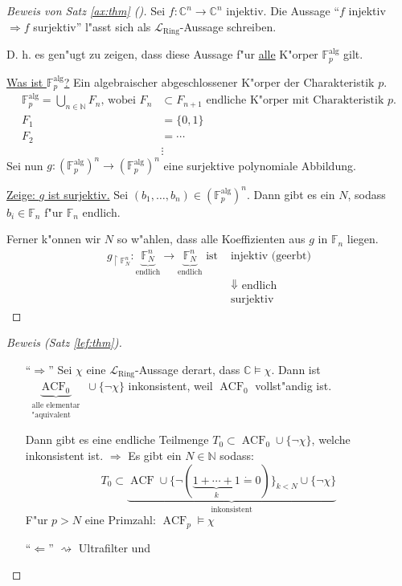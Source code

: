 \documentclass[a4paper,12pt,numbers=noenddot,parskip=full]{scrartcl}
\newcommand{\setN}{\mathbb{N}}
\newcommand{\setC}{\mathbb{C}}
\newcommand{\scrL}{\mathcal{L}}
\DeclareMathOperator{\acf}{ACF}
\theoremstyle{dotless}
\theoremstyle{remark}
\begin{document}
\begin{proof}[Beweis von Satz \ref{ax:thm} ()]
	Sei $f: \setC^n \longrightarrow \setC^n$ injektiv. Die Aussage "`$f$ injektiv $\Rightarrow f$ surjektiv"' l"asst sich als $\scrL_\text{Ring}$-Aussage schreiben.
	
	D. h. es gen"ugt zu zeigen, dass diese Aussage f"ur \underline{alle} K"orper $\mathbb{F}^\text{alg}_p$ gilt.
	
	\underline{Was ist $\mathbb{F}^\text{alg}_p$?} Ein algebraischer abgeschlossener K"orper der Charakteristik $p$.
	\begin{align*}
		\mathbb{F}^\text{alg}_p = \bigcup\limits_{n \in \setN} F_n \text{, wobei } F_n &\subset F_{n+1} \text{ endliche K"orper mit Charakteristik } p.\\
		F_1&=\{0,1\}\\
		F_2&= \cdots\\
		&\vdots
	\end{align*}
	Sei nun $g: (\mathbb{F}^\text{alg}_p)^n \longrightarrow (\mathbb{F}^\text{alg}_p)^n$ eine surjektive polynomiale Abbildung.
	
	\underline{Zeige: $g$ ist surjektiv.} Sei $(b_1, \dots, b_n) \in (\mathbb{F}^\text{alg}_p)^n$. Dann gibt es ein $N$, sodass $b_i \in \mathbb{F}_n$ f"ur $\mathbb{F}_n$ endlich.
	
	Ferner k"onnen wir $N$ so w"ahlen, dass alle Koeffizienten aus $g$ in $\mathbb{F}_n$ liegen.
	\begin{align*}
		g_{\upharpoonright \mathbb{F}^n_N}: \underbrace{\mathbb{F}^n_N}_{\text{endlich}} \longrightarrow \underbrace{\mathbb{F}^n_N}_{\text{endlich}} \text{ ist }&\text{injektiv (geerbt)}\\
		&\Downarrow \text{ endlich} \\
		&\text{surjektiv}
	\end{align*}
\end{proof}

\begin{proof}[Beweis  (Satz \ref{lef:thm})]
	\begin{itemize}
		\item["`$\Rightarrow$"'] Sei $\chi$ eine $\scrL_\text{Ring}$-Aussage derart, dass $\setC \models \chi$. Dann ist $\underbrace{\acf_0}_{\substack{\text{alle elementar}\\ \text{"aquivalent}}} \cup \{\lnot \chi \}$ inkonsistent, weil $\acf_0$ vollst"andig ist.
		
		Dann gibt es eine endliche Teilmenge $T_0 \subset \acf_0 \cup \{\lnot \chi \}$, welche inkonsistent ist. $\Rightarrow$ Es gibt ein $N \in \setN$ sodass:
		\begin{equation*}
			T_0 \subset \underbrace{\acf \cup \{\lnot (\underbrace{1+ \cdots +1}_k \dot= 0) \}_{k<N} \cup \{\lnot \chi \}}_{\text{inkonsistent}}
		\end{equation*}
		F"ur $p>N$ eine Primzahl: $\acf_p \models \chi$
		
		\item["`$\Leftarrow$"'] $\rightsquigarrow$ Ultrafilter und 
	\end{itemize}
\end{proof}
		
\end{document}
